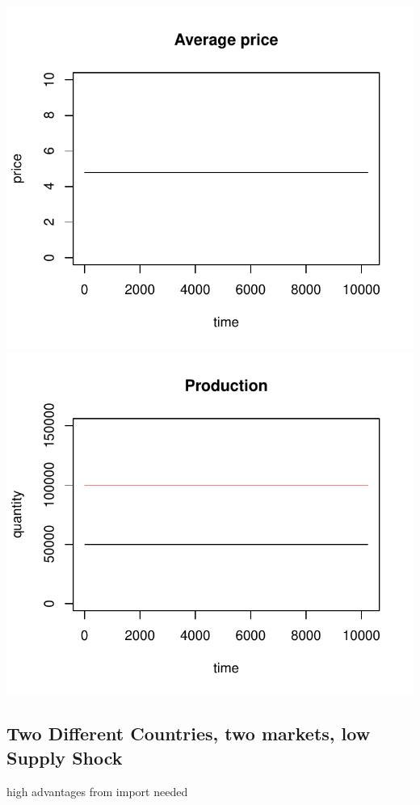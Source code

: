 \documentclass{article}
\begin{document}
\noindent
\vskip-5mm
\hskip-1cm
\includegraphics[scale=0.5]{fig_case01_price}
\includegraphics[scale=0.5]{fig_case01_production}

\newpage
\subsection{Two Different Countries, two markets, low Supply Shock}
high advantages from import needed
\end{document}
